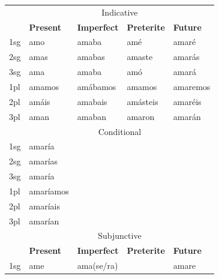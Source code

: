 \begin{table}[!htpb]
  \centering
  \begin{tabular}{lllll}
    \lsptoprule
        & \multicolumn{4}{c}{Indicative}                                                  \\
        & \textbf{Present}    & \textbf{Imperfect} & \textbf{Preterite} & \textbf{Future} \\
    \midrule
    1sg & amo                 & amaba              & amé                & amaré           \\
    2sg & amas                & amabas             & amaste             & amarás          \\
    3sg & ama                 & amaba              & amó                & amará           \\
    1pl & amamos              & amábamos           & amamos             & amaremos        \\
    2pl & amáis               & amabais            & amásteis           & amaréis         \\
    3pl & aman                & amaban             & amaron             & amarán          \\
    \midrule
        & \multicolumn{4}{c}{Conditional}                                                 \\
    \midrule
    1sg & amaría                                                                          \\
    2sg & amarías                                                                         \\
    3sg & amaría                                                                          \\
    1pl & amaríamos                                                                       \\
    2pl & amaríais                                                                        \\
    3pl & amarían                                                                         \\
    \midrule
        & \multicolumn{4}{c}{Subjunctive}                                                 \\
        & \textbf{Present}    & \textbf{Imperfect} & \textbf{Preterite} & \textbf{Future} \\
    \midrule
    1sg & ame                 & ama(se/ra)         &                    & amare           \\

\end{tabular}
\end{table}
